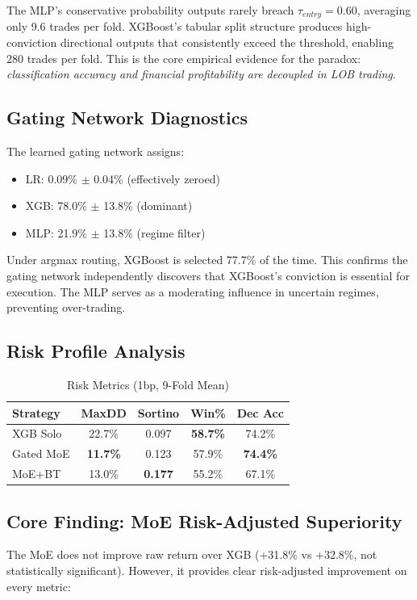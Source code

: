 \documentclass[conference]{IEEEtran}
\begin{document}
The MLP's conservative probability outputs rarely breach
$\tau_{entry}=0.60$, averaging only 9.6 trades per fold. XGBoost's
tabular split structure produces high-conviction directional outputs
that consistently exceed the threshold, enabling 280 trades per fold.
This is the core empirical evidence for the paradox: \textit{classification
accuracy and financial profitability are decoupled in LOB trading}.

\subsection{Gating Network Diagnostics}
The learned gating network assigns:
\begin{itemize}
    \item LR: 0.09\% $\pm$ 0.04\% (effectively zeroed)
    \item XGB: 78.0\% $\pm$ 13.8\% (dominant)
    \item MLP: 21.9\% $\pm$ 13.8\% (regime filter)
\end{itemize}
Under argmax routing, XGBoost is selected 77.7\% of the time. This
confirms the gating network independently discovers that XGBoost's
conviction is essential for execution. The MLP serves as a moderating
influence in uncertain regimes, preventing over-trading.

\subsection{Risk Profile Analysis}
\begin{table}[htbp]
\caption{Risk Metrics (1bp, 9-Fold Mean)}
\begin{center}
\begin{tabular}{lcccc}
\toprule
\textbf{Strategy} & \textbf{MaxDD} & \textbf{Sortino} & \textbf{Win\%} & \textbf{Dec Acc} \\
\midrule
XGB Solo      & 22.7\% & 0.097 & \textbf{58.7\%} & 74.2\% \\
Gated MoE     & \textbf{11.7\%} & 0.123 & 57.9\% & \textbf{74.4\%} \\
MoE+BT        & 13.0\% & \textbf{0.177} & 55.2\% & 67.1\% \\
\bottomrule
\end{tabular}
\end{center}
\end{table}

\subsection{Core Finding: MoE Risk-Adjusted Superiority}
The MoE does not improve raw return over XGB (+31.8\% vs +32.8\%,
not statistically significant). However, it provides clear
risk-adjusted improvement on every metric:
\end{document}
